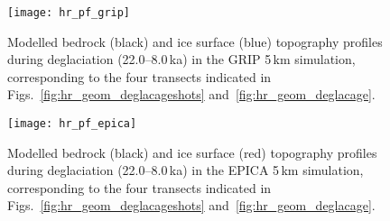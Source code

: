 \documentclass[tc, manuscript]{copernicus}
\begin{document}
\begin{figure}
  \texttt{[image: hr\_pf\_grip]}
  \caption{Modelled bedrock (black) and ice surface (blue) topography profiles
           during deglaciation (22.0--8.0\,\unit{ka}) in the GRIP 5\,\unit{km}
           simulation, corresponding to the four transects indicated in
           Figs.~\ref{fig:hr_geom_deglacageshots} and~\ref{fig:hr_geom_deglacage}.}
  \label{fig:hr_pf_grip}
\end{figure}

\begin{figure}
  \texttt{[image: hr\_pf\_epica]}
  \caption{Modelled bedrock (black) and ice surface (red) topography profiles
           during deglaciation (22.0--8.0\,\unit{ka}) in the EPICA 5\,\unit{km}
           simulation, corresponding to the four transects indicated in
           Figs.~\ref{fig:hr_geom_deglacageshots} and~\ref{fig:hr_geom_deglacage}.}
  \label{fig:hr_pf_epica}
\end{figure}
\end{document}
